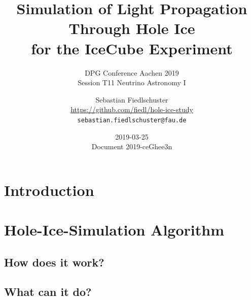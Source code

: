 \documentclass[green, 12pt]{beamer}
\title[Simulation of Light Propagation Through Hole Ice in IceCube]{Simulation of Light Propagation Through Hole Ice\\for the IceCube Experiment}
\subtitle{DPG Conference Aachen 2019\\Session T11 Neutrino Astronomy I}
\date{2019-03-25 \\ \vspace*{2mm} \tiny{Document 2019-ceGhee3n} \normalsize}
\author[Sebastian Fiedlschuster, ECAP Erlangen, 2019-03-25]{Sebastian Fiedlschuster \\ \tiny{\url{https://github.com/fiedl/hole-ice-study}} \\ \tiny\texttt{sebastian.fiedlschuster@fau.de}}
\institute{Erlangen Centre for Astroparticle Physics}
\newif\ifplacelogo %
\begin{document}



\placelogofalse

\section{Introduction}
  
  
  
%  

\section{Hole-Ice-Simulation Algorithm}
\subsection{How does it work?}
  
\subsection{What can it do?}
  
  
  

%   
%   
%   
%   
%   
%   
%   
\end{document}
